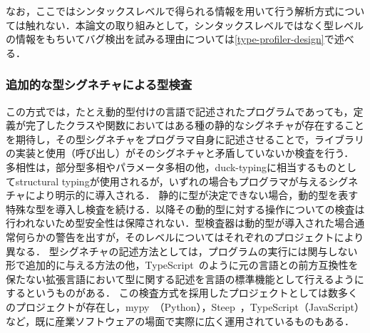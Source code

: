 なお，ここではシンタックスレベルで得られる情報を用いて行う解析方式については触れない．本論文の取り組みとして，シンタックスレベルではなく型レベルの情報をもちいてバグ検出を試みる理由については\ref{type-profiler-design}で述べる．

\subsubsection{追加的な型シグネチャによる型検査}

この方式では，たとえ動的型付けの言語で記述されたプログラムであっても，定義が完了したクラスや関数においてはある種の静的なシグネチャが存在することを期待し，その型シグネチャをプログラマ自身に記述させることで，ライブラリの実装と使用（呼び出し）がそのシグネチャと矛盾していないか検査を行う\cite{ruby-progress-report}．
多相性は，部分型多相やパラメータ多相の他，duck-typingに相当するものとしてstructural typingが使用されるが\footnotemark，いずれの場合もプログラマが与えるシグネチャにより明示的に導入される．
静的に型が決定できない場合，動的型を表す特殊な型を導入し検査を続ける．以降その動的型に対する操作についての検査は行われないため型安全性は保障されない．型検査器は動的型が導入された場合通常何らかの警告を出すが，そのレベルについてはそれぞれのプロジェクトにより異なる．
型シグネチャの記述方法としては，プログラムの実行には関与しない形で追加的に与える方法\footnotemark の他，TypeScript~\cite{typescript}のように元の言語との前方互換性を保たない拡張言語において型に関する記述を言語の標準機能として行えるようにするというものがある．
この検査方式を採用したプロジェクトとしては数多くのプロジェクトが存在し，mypy~\cite{mypy}（Python），Steep~\cite{steep}，TypeScript（JavaScript）など，既に産業ソフトウェアの場面で実際に広く運用されているものもある．


